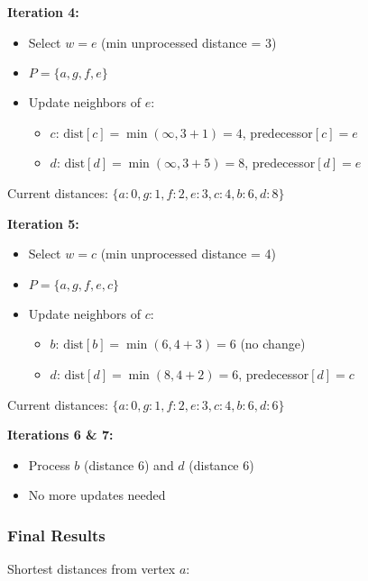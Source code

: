 \documentclass[12pt,a4paper]{article}
\begin{document}
\textbf{Iteration 4:}
\begin{itemize}
    \item Select $w = e$ (min unprocessed distance = 3)
    \item $P = \{a, g, f, e\}$
    \item Update neighbors of $e$:
    \begin{itemize}
        \item $c$: $\text{dist}[c] = \min(\infty, 3 + 1) = 4$, predecessor$[c] = e$
        \item $d$: $\text{dist}[d] = \min(\infty, 3 + 5) = 8$, predecessor$[d] = e$
    \end{itemize}
\end{itemize}

Current distances: $\{a: 0, g: 1, f: 2, e: 3, c: 4, b: 6, d: 8\}$

\textbf{Iteration 5:}
\begin{itemize}
    \item Select $w = c$ (min unprocessed distance = 4)
    \item $P = \{a, g, f, e, c\}$
    \item Update neighbors of $c$:
    \begin{itemize}
        \item $b$: $\text{dist}[b] = \min(6, 4 + 3) = 6$ (no change)
        \item $d$: $\text{dist}[d] = \min(8, 4 + 2) = 6$, predecessor$[d] = c$
    \end{itemize}
\end{itemize}

Current distances: $\{a: 0, g: 1, f: 2, e: 3, c: 4, b: 6, d: 6\}$

\textbf{Iterations 6 \& 7:}
\begin{itemize}
    \item Process $b$ (distance 6) and $d$ (distance 6)
    \item No more updates needed
\end{itemize}

\subsubsection{Final Results}

Shortest distances from vertex $a$:
\end{document}
